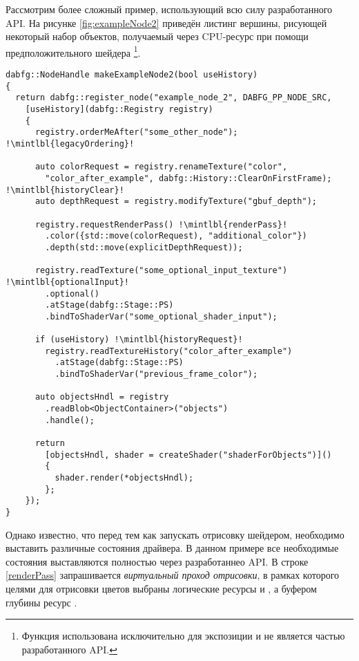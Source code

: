Рассмотрим более сложный пример, использующий всю силу разработанного API.
На рисунке \ref{fig:exampleNode2} приведён листинг вершины, рисующей некоторый набор объектов, получаемый через CPU-ресурс  при помощи предположительного шейдера \footnote{Функция  использована исключительно для экспозиции и не является частью разработанного API.}.
\begin{figure*}
\begin{verbatim}
dabfg::NodeHandle makeExampleNode2(bool useHistory)
{
  return dabfg::register_node("example_node_2", DABFG_PP_NODE_SRC,
    [useHistory](dabfg::Registry registry)
    {
      registry.orderMeAfter("some_other_node"); !\mintlbl{legacyOrdering}!

      auto colorRequest = registry.renameTexture("color",
        "color_after_example", dabfg::History::ClearOnFirstFrame); !\mintlbl{historyClear}!
      auto depthRequest = registry.modifyTexture("gbuf_depth");

      registry.requestRenderPass() !\mintlbl{renderPass}!
        .color({std::move(colorRequest), "additional_color"})
        .depth(std::move(explicitDepthRequest));

      registry.readTexture("some_optional_input_texture") !\mintlbl{optionalInput}!
        .optional()
        .atStage(dabfg::Stage::PS)
        .bindToShaderVar("some_optional_shader_input");

      if (useHistory) !\mintlbl{historyRequest}!
        registry.readTextureHistory("color_after_example")
          .atStage(dabfg::Stage::PS)
          .bindToShaderVar("previous_frame_color");

      auto objectsHndl = registry
        .readBlob<ObjectContainer>("objects")
        .handle();

      return
        [objectsHndl, shader = createShader("shaderForObjects")]()
        {
          shader.render(*objectsHndl);
        };
    });
}
\end{verbatim}
\caption{Листинг усложнённого примера использования разработанного API.}
\label{fig:exampleNode2}
\end{figure*}
Однако известно, что перед тем как запускать отрисовку шейдером, необходимо выставить различные состояния драйвера.
В данном примере все необходимые состояния выставляются полностью через разработаннео API.
В строке \ref{renderPass} запрашивается \textit{виртуальный проход отрисовки}, в рамках которого целями для отрисовки цветов выбраны логические ресурсы  и , а буфером глубины ресурс .
